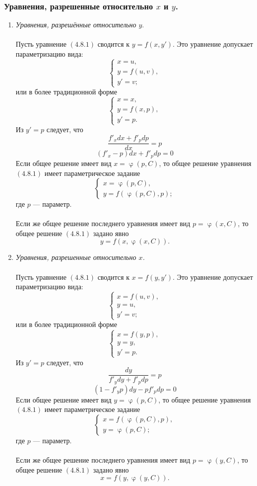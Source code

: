 \documentclass[a4paper, 12pt]{report}
\renewcommand{\varphi}{\upvarphi}
\begin{document}
\subsubsection{Уравнения, разрешенные относительно $x$ и $y$.}
\begin{enumerate}
	\item\textit{ Уравнения, разрешённые относительно $y$}.\\\\
	Пусть уравнение $(4.8.1)$ сводится к $y = f(x, y')$. Это уравнение допускает параметризацию вида:
	$$\begin{cases}
		x = u,\\
		y = f(u, v),\\
		y' = v;
	\end{cases}$$ или в более традиционной форме
	$$\begin{cases}
	x = x,\\
	y = f(x, p),\\
	y' = p.
\end{cases}$$
Из $y' = p$ следует, что
$$\frac{f'_xdx + f'_pdp}{dx} = p$$
$$(f'_x - p)dx + f'_pdp = 0$$
Если общее решение имеет вид $x = \varphi(p, C)$, то общее решение уравнения $(4.8.1)$ имеет параметрическое задание $$\begin{cases}
	x = \varphi(p, C),\\
	y = f(\varphi(p, C), p);
\end{cases}$$ где $p$ --- параметр.\\\\
Если же общее решение последнего уравнения имеет вид $p = \varphi(x, C)$, то общее решение $(4.8.1)$ задано явно $$y = f(x, \varphi(x, C)).$$
	\item\textit{ Уравнения, разрешенные относительно $x$.}\\\\
	Пусть уравнение $(4.8.1)$ сводится к $x = f(y, y')$. Это уравнение допускает параметризацию вида:
	$$\begin{cases}
		x = f(u, v),\\
		y = u,\\
		y' = v;
	\end{cases}$$ или в более традиционной форме
	$$\begin{cases}
		x = f(y, p),\\
		y = y,\\
		y' = p.
	\end{cases}$$
	Из $y' = p$ следует, что
	$$\frac{dy}{f'_ydy + f'_pdp} = p$$
	$$(1 - f'_yp)dy - pf'_pdp = 0$$
	Если общее решение имеет вид $y = \varphi(p, C)$, то общее решение уравнения $(4.8.1)$ имеет параметрическое задание $$\begin{cases}
		x = f(\varphi(p, C), p),\\
		y =  \varphi(p, C);
	\end{cases}$$ где $p$ --- параметр.\\\\
	Если же общее решение последнего уравнения имеет вид $p = \varphi(y, C)$, то общее решение $(4.8.1)$ задано явно $$x = f(y, \varphi(y, C)).$$
\end{enumerate}
\end{document}

